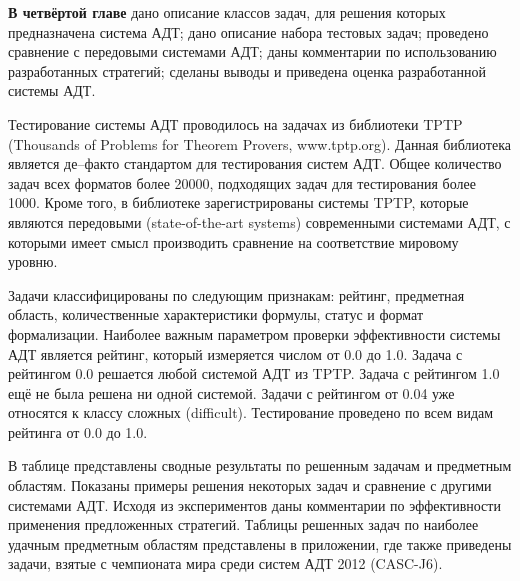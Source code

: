 \documentclass[a4paper]{report}
\begin{document}
\textbf{В четвёртой главе} дано описание классов задач, для решения которых предназначена система АДТ; дано описание набора тестовых задач; проведено сравнение с передовыми системами АДТ; даны комментарии по использованию разработанных стратегий; сделаны выводы и приведена оценка разработанной системы АДТ.

Тестирование системы АДТ проводилось на задачах из библиотеки TPTP (Thousands of Problems for Theorem Provers, www.tptp.org). Данная библиотека является де--факто стандартом для тестирования систем АДТ. Общее количество задач всех форматов более 20000, подходящих задач для тестирования более 1000. Кроме того,  в библиотеке зарегистрированы системы TPTP, которые являются передовыми (state-of-the-art systems) современными системами АДТ, с которыми имеет смысл производить сравнение на соответствие мировому уровню.

Задачи классифицированы по следующим признакам: рейтинг, предметная область, количественные характеристики формулы, статус и формат формализации. Наиболее важным параметром проверки эффективности системы АДТ является рейтинг, который измеряется числом от 0.0 до 1.0. Задача с рейтингом 0.0 решается любой системой АДТ из TPTP. Задача с рейтингом 1.0 ещё не была решена ни одной системой. Задачи с рейтингом от 0.04 уже относятся к классу сложных (difficult). Тестирование проведено по всем видам рейтинга от 0.0 до 1.0.

В таблице представлены сводные результаты по решенным задачам и предметным областям. Показаны примеры решения некоторых задач и сравнение с другими системами АДТ. Исходя из экспериментов даны комментарии по эффективности применения предложенных стратегий. Таблицы решенных задач по наиболее удачным предметным областям представлены в приложении, где также приведены задачи, взятые с чемпионата мира среди систем АДТ 2012 (CASC-J6).



\setcounter{table}{0}
\newpage
\end{document}
